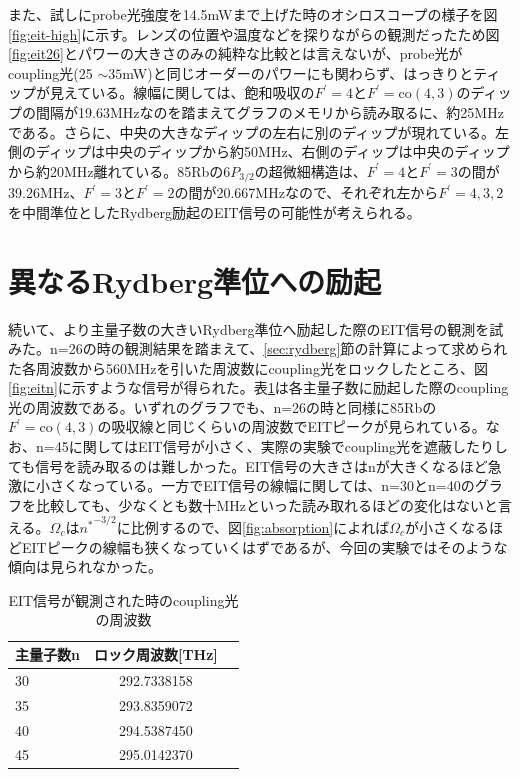 \documentclass[dvipdfmx]{jsreport}
\begin{document}
また、試しにprobe光強度を14.5mWまで上げた時のオシロスコープの様子を図\ref{fig:eit-high}に示す。レンズの位置や温度などを探りながらの観測だったため図\ref{fig:eit26}とパワーの大きさのみの純粋な比較とは言えないが、probe光がcoupling光(25 $\sim 35$mW)と同じオーダーのパワーにも関わらず、はっきりとティップが見えている。線幅に関しては、飽和吸収の$F^{'} = 4$と$F^{'} = \text{co}(4,3)$のディップの間隔が19.63MHzなのを踏まえてグラフのメモリから読み取るに、約25MHzである。さらに、中央の大きなディップの左右に別のディップが現れている。左側のディップは中央のディップから約50MHz、右側のディップは中央のディップから約20MHz離れている。85Rbの$6P_{3/2}$の超微細構造は、$F^{'} = 4$と$F^{'} = 3$の間が39.26MHz、$F^{'} = 3$と$F^{'} = 2$の間が20.667MHzなので\cite{hyperfine}、それぞれ左から$F^{'} = 4,3,2$を中間準位としたRydberg励起のEIT信号の可能性が考えられる。

\section{異なるRydberg準位への励起}
続いて、より主量子数の大きいRydberg準位へ励起した際のEIT信号の観測を試みた。n=26の時の観測結果を踏まえて、\ref{sec:rydberg}節の計算によって求められた各周波数から560MHzを引いた周波数にcoupling光をロックしたところ、図\ref{fig:eitn}に示すような信号が得られた。表\ref{table:eit}は各主量子数に励起した際のcoupling光の周波数である。いずれのグラフでも、n=26の時と同様に85Rbの$F^{'} = \text{co}(4,3)$の吸収線と同じくらいの周波数でEITピークが見られている。なお、n=45に関してはEIT信号が小さく、実際の実験でcoupling光を遮蔽したりしても信号を読み取るのは難しかった。EIT信号の大きさはnが大きくなるほど急激に小さくなっている。一方でEIT信号の線幅に関しては、n=30とn=40のグラフを比較しても、少なくとも数十MHzといった読み取れるほどの変化はないと言える。$\Omega_c$は${n^*}^{-3/2}$に比例するので、図\ref{fig:absorption}によれば$\Omega_c$が小さくなるほどEITピークの線幅も狭くなっていくはずであるが、今回の実験ではそのような傾向は見られなかった。
\begin{table}[hbtp]
  \caption{EIT信号が観測された時のcoupling光の周波数}
  \label{table:eit}
  \centering
  \begin{tabular}{lcr}
    \hline
    主量子数n  & ロック周波数[THz]  \\
    \hline
    30  & 292.7338158 \\
    35  & 293.8359072 \\
    40  & 294.5387450 \\
    45  & 295.0142370 \\
    \hline
  \end{tabular}
\end{table}
\end{document}
